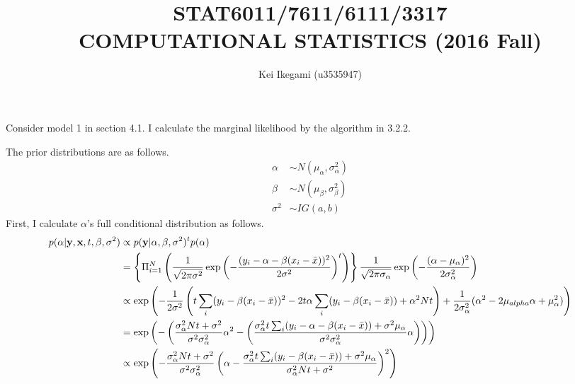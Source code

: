 \documentclass{article}
\begin{document}
\title{STAT6011/7611/6111/3317 \\ 
COMPUTATIONAL STATISTICS (2016 Fall)}
\author{Kei Ikegami (u3535947)}
\maketitle

\section{}
\subsection{}

	Consider model 1 in section 4.1. I calculate the marginal likelihood by the algorithm in 3.2.2.
	\par
	The prior distributions are as follows.
	\begin{align*}
		\alpha &\sim N(\mu_{\alpha}, \sigma^2_{\alpha}) \\
		\beta &\sim N(\mu_{\beta}, \sigma^2_{\beta})\\
		\sigma^2 &\sim IG(a, b)
	\end{align*}
	First, I calculate $\alpha$'s full conditional distribution as follows.
	\begin{align*}
		p(\alpha | {\bf y}, {\bf x}, t, \beta, \sigma^2) &\propto p({\bf y} | \alpha, \beta, \sigma^2)^t p(\alpha) \\
		&= \left\{ \Pi_{i=1}^{N} \left( \frac{1}{\sqrt{2\pi \sigma^2}} \exp \left( - \frac{(y_i - \alpha - \beta(x_i - \bar{x}))^2}{2\sigma^2}\right)^t \right) \right\} \frac{1}{\sqrt{2\pi \sigma_{\alpha}}} \exp \left( - \frac{(\alpha - \mu_{\alpha})^2}{2\sigma_{\alpha}^2}\right)\\
		&\propto \exp \left( - \frac{1}{2\sigma^2} \left( t \sum_i (y_i - \beta(x_i - \bar{x}))^2 - 2t \alpha \sum_i (y_i - \beta(x_i - \bar{x}))  + \alpha^2 Nt \right) + \frac{1}{2\sigma_{\alpha}^2} (\alpha^2 - 2\mu_{alpha} \alpha + \mu_{\alpha}^2)\right)\\
		&= \exp \left( - \left( \frac{\sigma_{\alpha}^2 Nt + \sigma^2}{\sigma^2 \sigma_{\alpha}^2} \alpha^2 - \left( \frac{\sigma_{\alpha}^2 t \sum_i (y_i - \alpha - \beta (x_i -\bar{x})) + \sigma^2 \mu_{\alpha}}{\sigma^2 \sigma_{\alpha} ^2} \alpha \right)\right)\right)\\
		&\propto \exp \left( -\frac{\sigma_{\alpha}^2 Nt + \sigma^2}{\sigma^2 \sigma_{\alpha}^2} \left( \alpha - \frac{\sigma_{\alpha}^2 t \sum_i (y_i - \beta(x_i -\bar{x})) + \sigma^2 \mu_{\alpha}}{\sigma_{\alpha}^2 Nt + \sigma^2} \right)^2 \right)\\
	\end{align*}
\end{document}
